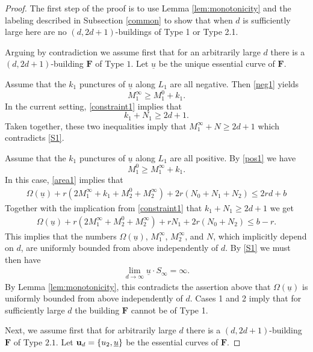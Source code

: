 \documentclass[12pt]{amsart}
\theoremstyle{definition}
\begin{document}
\begin{proof}

\noindent The first step of the proof is to use Lemma \ref{lem:monotonicity} and the  labeling described  in Subsection \ref{common} to show that when $d$ is sufficiently large here are no  $(d,2d+1)$-buildings of Type 1 or Type 2.1.  

Arguing by contradiction we assume first that for an arbitrarily large  $d$ there is a $(d,2d+1)$-building $\mathbf{F}$ of Type $1$. Let $\underline{u}$ be the unique essential curve of $\mathbf{F}$.


\medskip

 Assume that the $k_1$ punctures of $\underline{u}$ along $L_1$ are all negative. Then \eqref{neg1} yields $$M_1^\infty \geq M_1^0 + k_1.$$ In the current setting,  \eqref{constraint1} implies that $$k_1 +N_1 \geq 2d+1.$$ Taken together, these two inequalities imply that $M^{\infty}_1+ N \geq 2d+1$ which  contradicts \eqref{S1}.

\medskip

 Assume that the $k_1$ punctures of $\underline{u}$ along $L_1$ are all positive. By \eqref{pos1} we have $$M_1^0 \geq M_1^\infty + k_1.$$ In this case, \eqref{area1} implies that 
\begin{align*}
\Omega(\underline{u})+ r(2M_1^\infty +k_1 + M_2^0 + M_2^\infty)+2r(N_0+N_1+N_2)
\leq 2rd+b  
\end{align*}
Together with the implication from  \eqref{constraint1} that $k_1 +N_1 \geq 2d     +1$ we get
\begin{align*}
\Omega(\underline{u})+ r(2M_1^\infty + M_2^0 + M_2^\infty) +rN_1 +2r(N_0 + N_2)  \leq b-r.  
\end{align*}
This implies that the numbers $\Omega(\underline{u})$,  $M_1^\infty$, $M_2^\infty$, and $N$, which implicitly depend on $d$, are uniformly bounded from above independently of $d$. By \eqref{S1} we must then have  \begin{align*} \lim_{d \to \infty} \underline{u} \cdot S_{\infty} = \infty.\end{align*}  By Lemma \ref{lem:monotonicity}, this contradicts the assertion above that $\Omega(\underline{u})$ is uniformly bounded from above independently of $d$. Cases 1 and 2 imply that for sufficiently large $d$ the building $\mathbf{F}$ cannot be of Type 1.

\medskip

Next, we assume first that for arbitrarily large $d$ there is a $(d,2d+1)$-building $\mathbf{F}$ of Type $2.1$. Let ${\bf{u}}_d=\{ u_2, \underline{u}\}$ be the essential curves of $\mathbf{F}$.


\end{proof}
\end{document}
